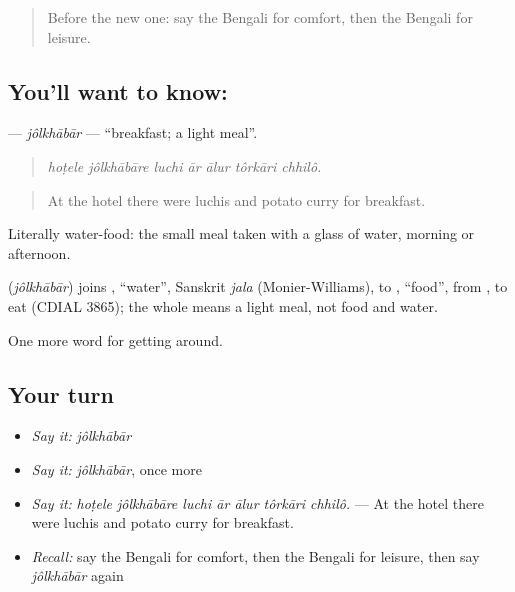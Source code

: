 \label{lesson:BN-C404-jolkhabar}



\begin{quote}
Before the new one: say the Bengali for comfort, then the Bengali for leisure.
\end{quote}

\subsection*{You'll want to know: }
\textbf{} — \emph{jôlkhābār} — \textquotedblleft{}breakfast; a light meal\textquotedblright{}.

\begin{quote}
      
\end{quote}

\begin{quote}
\emph{hoṭele jôlkhābāre luchi ār ālur tôrkāri chhilô.}
\end{quote}

\begin{quote}
At the hotel there were luchis and potato curry for breakfast.
\end{quote}

Literally water-food: the small meal taken with a glass of water, morning or afternoon.

\begin{cousinweb}
\textbf{} (\emph{jôlkhābār}) joins \textbf{}, \textquotedblleft{}water\textquotedblright{}, Sanskrit \emph{jala} (Monier-Williams), to \textbf{}, \textquotedblleft{}food\textquotedblright{}, from , to eat (CDIAL 3865); the whole means a light meal, not food and water.
\end{cousinweb}

\begin{grammarlens}[title={What you've built}]
One more word for getting around.
\end{grammarlens}

\subsection*{Your turn}
\begin{itemize}
\raggedright
  \item \emph{Say it:} \emph{jôlkhābār}
  \item \emph{Say it:} \emph{jôlkhābār}, once more
  \item \emph{Say it:} \emph{hoṭele jôlkhābāre luchi ār ālur tôrkāri chhilô.} — At the hotel there were luchis and potato curry for breakfast.
  \item \emph{Recall:} say the Bengali for comfort, then the Bengali for leisure, then say \emph{jôlkhābār} again
\end{itemize}


